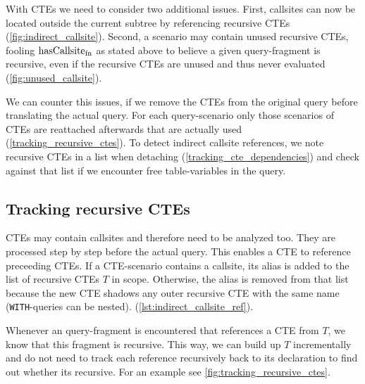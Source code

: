 With CTEs we need to consider two additional issues. First, callsites can now be located outside the current subtree by referencing recursive CTEs (\autoref{fig:indirect_callsite}). Second, a scenario may contain unused recursive CTEs, fooling $\operatorname{\text{hasCallsite}_{fn}}$ as stated above to believe a given query-fragment is recursive, even if the recursive CTEs are unused and thus never evaluated (\autoref{fig:unused_callsite}).

We can counter this issues, if we remove the CTEs from the original query before translating the actual query. For each query-scenario only those scenarios of CTEs are reattached afterwards that are actually used (\autoref{tracking_recursive_ctes}). To detect indirect callsite references, we note recursive CTEs in a list when detaching (\autoref{tracking_cte_dependencies}) and check against that list if we encounter free table-variables in the query.

\subsection{Tracking recursive CTEs}\label{tracking_recursive_ctes}

CTEs may contain callsites and therefore need to be analyzed too. They are processed step by step before the actual query. This enables a CTE to reference preceeding CTEs. If a CTE-scenario contains a callsite, its alias is added to the list of recursive CTEs $T$ in scope. Otherwise, the alias is removed from that list because the new CTE shadows any outer recursive CTE with the same name (\texttt{WITH}-queries can be nested). (\autoref{lst:indirect_callsite_ref}).

Whenever an query-fragment is encountered that references a CTE from $T$, we know that this fragment is recursive. This way, we can build up $T$ incrementally and do not need to track each reference recursively back to its declaration to find out whether its recursive. For an example see \autoref{fig:tracking_recursive_ctes}.

